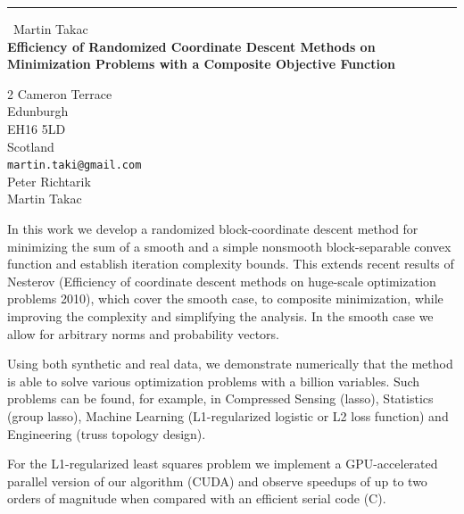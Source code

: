 \documentclass{report}
\begin{document}
\begin{center}
\rule{6in}{1pt} \
{\large Martin Takac \\
{\bf Efficiency of Randomized Coordinate Descent Methods on Minimization Problems with a Composite Objective Function }}

2 Cameron Terrace \\ Edunburgh \\ EH16 5LD \\ Scotland
\\
{\tt martin.taki@gmail.com}\\
Peter Richtarik\\
Martin Takac\end{center}

In this work we develop a randomized block-coordinate descent method for
minimizing the sum of a smooth and a simple nonsmooth block-separable
convex function and establish iteration complexity bounds. This extends
recent results of Nesterov (Efficiency of coordinate descent methods on
huge-scale optimization problems 2010), which cover the smooth case, to
composite minimization, while improving the complexity and simplifying
the analysis. In the smooth case we allow for arbitrary norms and
probability vectors.

Using both synthetic and real data, we demonstrate numerically that the
method is able to solve various optimization problems with a billion
variables. Such problems can be found, for example, in Compressed Sensing
(lasso), Statistics (group lasso), Machine Learning (L1-regularized
logistic or L2 loss function) and Engineering (truss topology design).

For the L1-regularized least squares problem we implement a
GPU-accelerated parallel version of our algorithm (CUDA) and observe
speedups of up to two orders of magnitude when compared with an efficient
serial code (C).
\end{document}
